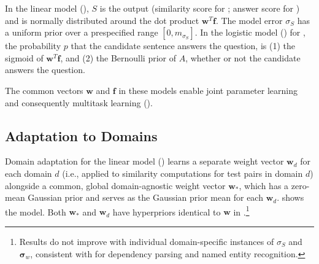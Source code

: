 In the linear model (), $S$ is the output
(similarity score for \sts{}; answer score for \sas{}) and is normally
distributed around the dot product
$\boldsymbol{w}^T\boldsymbol{f}$.  The model error $\sigma_S$ has a
uniform prior over a prespecified range $[0, m_{\sigma_S}]$.  In the
logistic model () for \asr{}, the probability
$p$ that the candidate sentence answers the question, is (1) the sigmoid of
$\boldsymbol{w}^T\boldsymbol{f}$, and (2) the Bernoulli prior of $A$,
whether or not the candidate answers the question.

The common vectors $\boldsymbol{w}$ and $\boldsymbol{f}$ in these models enable
joint parameter learning and consequently multitask learning ().


\subsection{Adaptation to \sts{} Domains}
\label{section:approach-da}


Domain adaptation for the linear model ()
learns a separate weight vector $\boldsymbol{w}_d$ for each
domain $d$ (i.e., applied to similarity computations for test pairs in
domain $d$) alongside a common, global domain-agnostic weight
vector $\boldsymbol{w}_*$, which has a zero-mean Gaussian prior and
serves as the Gaussian prior mean for each
$\boldsymbol{w}_d$.
 shows the model.
Both $\boldsymbol{w}_*$ and
$\boldsymbol{w}_d$ have hyperpriors identical to $\boldsymbol{w}$ in
.\footnote{Results do not improve with
  individual domain-specific instances of $\sigma_S$ and
  $\boldsymbol{\sigma}_w$, consistent with  for
  dependency parsing and named entity recognition.}

